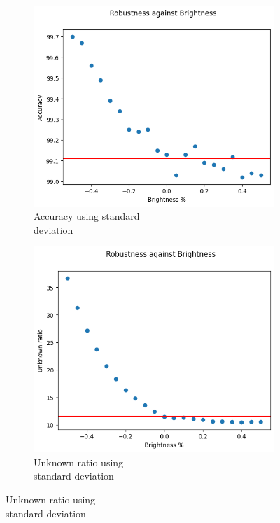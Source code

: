 \begin{figure}[h]
	\centering
	\begin{subfigure}{.33\textwidth}
		\centering
		\includegraphics[width=0.9\linewidth]{ImageFiles/EvalBNN/BR/VU/acc}
		\caption{Accuracy using standard \\ deviation}
		\label{fig:br_vu_acc}
	\end{subfigure}%
	\begin{subfigure}{.33\textwidth}
		\centering
		\includegraphics[width=0.9\linewidth]{ImageFiles/EvalBNN/BR/VU/unkn}
		\caption{Unknown ratio using \\ standard deviation}
		\label{fig:br_vu_unkn}
	\end{subfigure}%

\end{figure}
